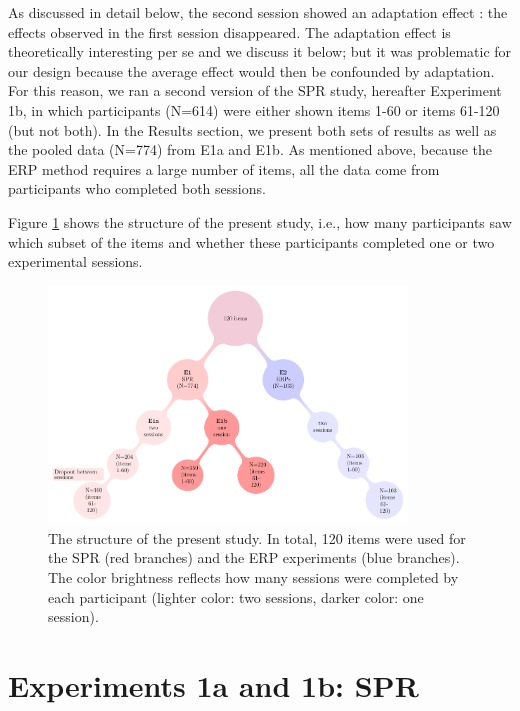 \documentclass[a4paper, man, floatsintext]{apa7}
\begin{document}
As discussed in detail below, the second session showed an adaptation effect \parencite{prasad2021rapid}: the effects observed in the first session disappeared. The adaptation effect is theoretically interesting per se \parencite{fine2013rapid} and we discuss it below; but it was problematic for our design because the average effect would then be confounded by adaptation. For this reason, we ran a second version of the SPR study, hereafter Experiment 1b, in which participants (N=614) were either shown items 1-60 or items 61-120 (but not both). In the Results section, we present both sets of results as well as the pooled data (N=774) from E1a and E1b.
As mentioned above, because the ERP method requires a large number of items, all the data come from participants who completed both sessions. 

Figure \ref{fig:project_str} shows the structure of the present study, i.e., how many participants saw which subset of the items and whether these participants completed one or two experimental sessions.

\begin{figure}[H]
    \caption{The structure of the present study. In total, 120 items were used for the SPR (red branches) and the ERP experiments (blue branches). The color brightness reflects how many sessions were completed by each participant (lighter color: two sessions, darker color: one session).}
    \label{fig:project_str}
    \centering
    \includegraphics[width=0.85\textwidth]{images/pandora_project_structure_figure.pdf}
\end{figure}


\section{Experiments 1a and 1b: SPR}
\end{document}
